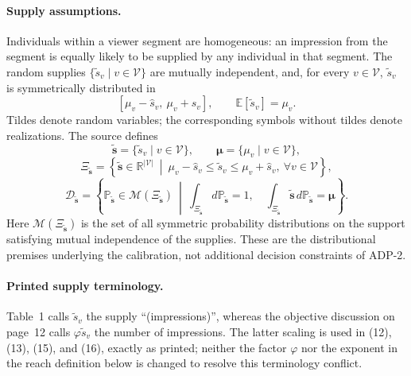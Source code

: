 \documentclass{article}
\begin{document}
\paragraph{Supply assumptions.}
Individuals within a viewer segment are homogeneous: an impression from the segment is equally likely to be supplied by any individual in that segment. The random supplies $\{\tilde s_v\mid v\in\mathcal V\}$ are mutually independent, and, for every $v\in\mathcal V$, $\tilde s_v$ is symmetrically distributed in
\[
[\mu_v-\hat s_v,\ \mu_v+\hat s_v],\qquad
\mathbb E[\tilde s_v]=\mu_v.
\]
Tildes denote random variables; the corresponding symbols without tildes denote realizations. The source defines
\[
\tilde{\boldsymbol s}=\{\tilde s_v\mid v\in\mathcal V\},\qquad
\boldsymbol\mu=\{\mu_v\mid v\in\mathcal V\},
\]
\[
\Xi_{\tilde{\boldsymbol s}}=
\left\{\tilde{\boldsymbol s}\in\mathbb R^{|\mathcal V|}\ \middle|\
\mu_v-\hat s_v\leq\tilde s_v\leq\mu_v+\hat s_v,\ \forall v\in\mathcal V\right\},
\]
\[
\mathcal D_{\tilde{\boldsymbol s}}=
\left\{\mathbb P_{\tilde{\boldsymbol s}}\in\mathcal M(\Xi_{\tilde{\boldsymbol s}})\ \middle|\
\int_{\Xi_{\tilde{\boldsymbol s}}}d\mathbb P_{\tilde{\boldsymbol s}}=1,\quad
\int_{\Xi_{\tilde{\boldsymbol s}}}\tilde{\boldsymbol s}\,d\mathbb P_{\tilde{\boldsymbol s}}=\boldsymbol\mu
\right\}.
\]
Here $\mathcal M(\Xi_{\tilde{\boldsymbol s}})$ is the set of all symmetric probability distributions on the support satisfying mutual independence of the supplies. These are the distributional premises underlying the calibration, not additional decision constraints of ADP-2.

\paragraph{Printed supply terminology.}
Table~1 calls $\tilde s_v$ the supply ``(impressions)'', whereas the objective discussion on page~12 calls $\varphi\tilde s_v$ the number of impressions. The latter scaling is used in (12), (13), (15), and (16), exactly as printed; neither the factor $\varphi$ nor the exponent in the reach definition below is changed to resolve this terminology conflict.
\end{document}
